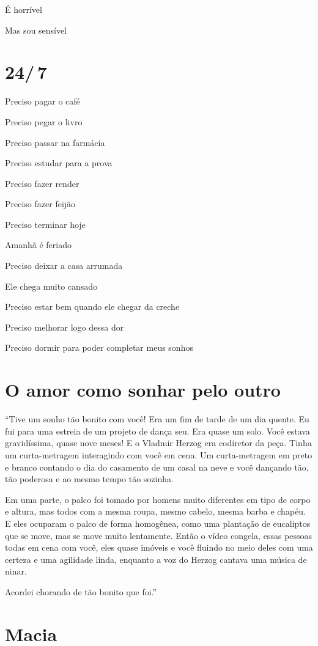 {{É horrível

Mas sou sensível

\chapter{24/\,7}

Preciso pagar o café

Preciso pegar o livro

Preciso passar na farmácia

Preciso estudar para a prova

Preciso fazer render

Preciso fazer feijão

Preciso terminar hoje

Amanhã é feriado

Preciso deixar a casa arrumada

Ele chega muito cansado

Preciso estar bem quando ele chegar da creche

Preciso melhorar logo dessa dor

Preciso dormir para poder completar meus sonhos
}
\chapter{O amor como sonhar pelo outro}

``Tive um sonho tão bonito com você! Era um fim de tarde de um dia
quente. Eu fui para uma estreia de um projeto de dança seu. Era quase um
solo. Você estava gravidíssima, quase nove meses! E o Vladmir Herzog era
codiretor da peça. Tinha um curta-metragem interagindo com você em cena.
Um curta-metragem em preto e branco contando o dia do casamento de um
casal na neve e você dançando tão, tão poderosa e ao mesmo tempo tão
sozinha.

Em uma parte, o palco foi tomado por homens muito diferentes em tipo de
corpo e altura, mas todos com a mesma roupa, mesmo cabelo, mesma barba e
chapéu. E eles ocuparam o palco de forma homogênea, como uma plantação
de eucaliptos que se move, mas se move muito lentamente. Então o vídeo
congela, essas pessoas todas em cena com você, eles quase imóveis e você
fluindo no meio deles com uma certeza e uma agilidade linda, enquanto a
voz do Herzog cantava uma música de ninar.

Acordei chorando de tão bonito que foi.''

\chapter{Macia}\label{macia}


}
